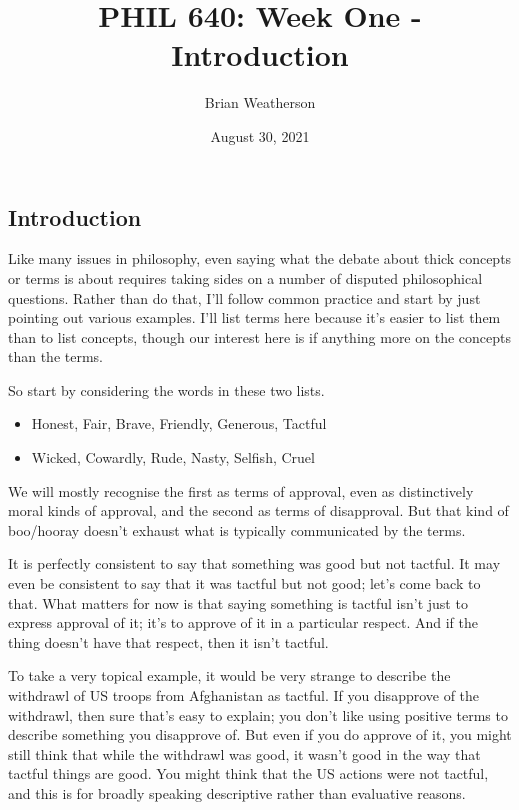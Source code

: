 \documentclass[
]{article}
\title{PHIL 640: Week One - Introduction}
\author{Brian Weatherson}
\date{August 30, 2021}
\providecommand{\tightlist}{%
  \setlength{\itemsep}{0pt}\setlength{\parskip}{0pt}}
\begin{document}
\maketitle

\hypertarget{introduction}{%
\subsection{Introduction}\label{introduction}}

Like many issues in philosophy, even saying what the debate about thick
concepts or terms is about requires taking sides on a number of disputed
philosophical questions. Rather than do that, I'll follow common
practice and start by just pointing out various examples. I'll list
terms here because it's easier to list them than to list concepts,
though our interest here is if anything more on the concepts than the
terms.

So start by considering the words in these two lists.

\begin{itemize}
\tightlist
\item
  Honest, Fair, Brave, Friendly, Generous, Tactful
\item
  Wicked, Cowardly, Rude, Nasty, Selfish, Cruel
\end{itemize}

We will mostly recognise the first as terms of approval, even as
distinctively moral kinds of approval, and the second as terms of
disapproval. But that kind of boo/hooray doesn't exhaust what is
typically communicated by the terms.

It is perfectly consistent to say that something was good but not
tactful. It may even be consistent to say that it was tactful but not
good; let's come back to that. What matters for now is that saying
something is tactful isn't just to express approval of it; it's to
approve of it in a particular respect. And if the thing doesn't have
that respect, then it isn't tactful.

To take a very topical example, it would be very strange to describe the
withdrawl of US troops from Afghanistan as tactful. If you disapprove of
the withdrawl, then sure that's easy to explain; you don't like using
positive terms to describe something you disapprove of. But even if you
do approve of it, you might still think that while the withdrawl was
good, it wasn't good in the way that tactful things are good. You might
think that the US actions were not tactful, and this is for broadly
speaking descriptive rather than evaluative reasons.
\end{document}
